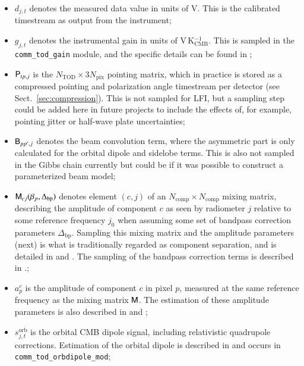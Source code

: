 \documentclass[twocolumn]{aa}
\newcommand{\B}[0]{\tens{B}}
\newcommand{\M}[0]{\tens{M}}
\renewcommand{\P}[0]{\tens{P}}
\newcommand{\Dbp}[0]{\Delta_{\mathrm{bp}}}
\begin{document}
\begin{itemize}
\item $d_{j,t}$ denotes the measured data value in units of V. This is the calibrated timestream as output from the instrument;

\item $g_{j,t}$ denotes the instrumental gain in units of V\,K$_{\mathrm{CMB}}^{-1}$. This is sampled in the  \texttt{comm\_tod\_gain} module, and the specific details can be found in \citet{BP07};

\item $\P_{tp,j}$ is the $N_{\mathrm{TOD}}\times 3N_{\mathrm{pix}}$
  pointing matrix, which in practice is stored as a compressed
  pointing and polarization angle timestream per detector (see Sect.~\ref{sec:compression}). This is not sampled for LFI, but a sampling
  step could be added here in future projects to include the effects
  of, for example, pointing jitter or half-wave plate uncertainties;
  
\item $\B_{pp',j}$ denotes the beam convolution term, where the asymmetric part is only calculated for the orbital dipole and sidelobe terms. This is also not sampled in the Gibbs chain currently but could be if it was possible to construct a parameterized beam model;

\item $\M_{cj}(\beta_{p}, \Dbp)$ denotes element $(c,j)$ of an
  $N_{\mathrm{comp}}\times N_{\mathrm{comp}}$ mixing matrix, describing the amplitude of component $c$ as
  seen by radiometer $j$ relative to some reference frequency $j_0$
  when assuming some set of bandpass correction parameters $\Dbp$. Sampling this mixing matrix and the amplitude parameters (next) is what is traditionally regarded as component separation, and is detailed in \citet{BP13} and \citet{BP14}. The sampling of the bandpass correction terms is described in \citet{BP09}.;
  
\item $a^c_{p}$ is the amplitude of component $c$ in pixel $p$,
  measured at the same reference frequency as the mixing matrix $\M$. The estimation of these amplitude parameters is also described in \citet{BP13} and \citet{BP14};
  
\item $s^{\mathrm{orb}}_{j,t}$ is the orbital CMB dipole signal, including relativistic quadrupole corrections. Estimation of the orbital dipole is described in \citet{BP08} and occurs in \texttt{comm\_tod\_orbdipole\_mod};
  

\end{itemize}
\end{document}
